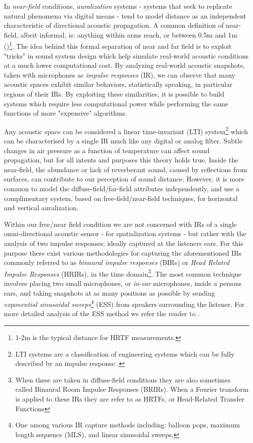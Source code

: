 In \textit{near-field} conditions, \textit{auralization} systems - systems that seek to replicate natural phenomena via digital means - tend to model distance as an independent characteristic of directional acoustic propagation. A common definition of near-field, albeit informal, is: anything within arms reach, or between 0.5m and 1m (\cite{Betbeder.2017})\footnote{1-2m is the typical distance for HRTF measurements.}. The idea behind this formal separation of near and far field is to exploit "tricks" in sound system design which help simulate real-world acoustic conditions at a much lower computational cost. By analyzing real-world acoustic snapshots, taken with microphones as \textit{impulse responses} (IR), we can observe that many acoustic spaces exhibit similar behaviors, statistically speaking, in particular regions of their IRs. By exploiting these similarities, it is possible to build systems which require less computational power while performing the same functions of more "expensive" algorithms.

Any acoustic space can be considered a linear time-invariant (LTI) system\footnote{LTI systems are a classification of engineering systems which can be fully described by an impulse response \cite{LinearTi32:online}.} which can be characterised by a single IR much like any digital or analog filter. Subtle changes in air pressure as a function of temperature can affect sound propagation, but for all intents and purposes this theory holds true. Inside the near-field, the abundance or lack of reverberant sound, caused by reflections from surfaces, can contribute to our perception of sound distance. However, it is more common to model the diffuse-field/far-field attributes independently, and use a complimentary system, based on free-field/near-field techniques, for horizontal and vertical auralization.

Within our free/near field condition we are not concerned with IRs of a single omni-directional acoustic sensor - for spatialization systems - but rather with the analysis of two impulse responses; ideally captured at the listeners ears. For this purpose there exist various methodologies for capturing the aforementioned IRs commonly referred to as \textit{binaural impulse responses} (BIRs) or \textit{Head Related Impulse Responses} (HRIRs), in the time domain\footnote{When these are taken in diffuse-field conditions they are also sometimes called Binaural Room Impulse Responses (BRIRs). When a Fourier transform is applied to these IRs they are refer to as HRTFs, or Head-Related Transfer Functions}. The most common technique involves placing two small microphones, or \textit{in-ear} microphones, inside a persons ears, and taking snapshots at as many positions as possible by sending \textit{exponential sinusoidal sweeps}\footnote{One among various IR capture methods including: balloon pops, maximum length sequence (MLS), and linear sinusoidal sweeps.} (ESS) from speakers surrounding the listener. For more detailed analysis of the ESS method we refer the reader to \cite{farina2007advancements}.


